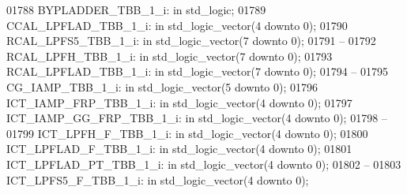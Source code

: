\begin{DoxyCode}
01788     BYPLADDER\_TBB\_1\_i:  \textcolor{keywordflow}{in} \textcolor{comment}{std\_logic};
01789     CCAL\_LPFLAD\_TBB\_1\_i:    \textcolor{keywordflow}{in} \textcolor{comment}{std\_logic\_vector}(\textcolor{vhdllogic}{}\textcolor{vhdllogic}{4} \textcolor{keywordflow}{downto} \textcolor{vhdllogic}{}\textcolor{vhdllogic}{0});
01790     RCAL\_LPFS5\_TBB\_1\_i: \textcolor{keywordflow}{in} \textcolor{comment}{std\_logic\_vector}(\textcolor{vhdllogic}{}\textcolor{vhdllogic}{7} \textcolor{keywordflow}{downto} \textcolor{vhdllogic}{}\textcolor{vhdllogic}{0});
01791 \textcolor{keyword}{    --}
01792     RCAL\_LPFH\_TBB\_1\_i:  \textcolor{keywordflow}{in} \textcolor{comment}{std\_logic\_vector}(\textcolor{vhdllogic}{}\textcolor{vhdllogic}{7} \textcolor{keywordflow}{downto} \textcolor{vhdllogic}{}\textcolor{vhdllogic}{0});
01793     RCAL\_LPFLAD\_TBB\_1\_i:    \textcolor{keywordflow}{in} \textcolor{comment}{std\_logic\_vector}(\textcolor{vhdllogic}{}\textcolor{vhdllogic}{7} \textcolor{keywordflow}{downto} \textcolor{vhdllogic}{}\textcolor{vhdllogic}{0});
01794 \textcolor{keyword}{    --}
01795     CG\_IAMP\_TBB\_1\_i:    \textcolor{keywordflow}{in} \textcolor{comment}{std\_logic\_vector}(\textcolor{vhdllogic}{}\textcolor{vhdllogic}{5} \textcolor{keywordflow}{downto} \textcolor{vhdllogic}{}\textcolor{vhdllogic}{0});
01796     ICT\_IAMP\_FRP\_TBB\_1\_i:   \textcolor{keywordflow}{in} \textcolor{comment}{std\_logic\_vector}(\textcolor{vhdllogic}{}\textcolor{vhdllogic}{4} \textcolor{keywordflow}{downto} \textcolor{vhdllogic}{}\textcolor{vhdllogic}{0});
01797     ICT\_IAMP\_GG\_FRP\_TBB\_1\_i:    \textcolor{keywordflow}{in} \textcolor{comment}{std\_logic\_vector}(\textcolor{vhdllogic}{}\textcolor{vhdllogic}{4} \textcolor{keywordflow}{downto} \textcolor{vhdllogic}{}\textcolor{vhdllogic}{0});
01798 \textcolor{keyword}{    --}
01799     ICT\_LPFH\_F\_TBB\_1\_i: \textcolor{keywordflow}{in} \textcolor{comment}{std\_logic\_vector}(\textcolor{vhdllogic}{}\textcolor{vhdllogic}{4} \textcolor{keywordflow}{downto} \textcolor{vhdllogic}{}\textcolor{vhdllogic}{0});
01800     ICT\_LPFLAD\_F\_TBB\_1\_i:   \textcolor{keywordflow}{in} \textcolor{comment}{std\_logic\_vector}(\textcolor{vhdllogic}{}\textcolor{vhdllogic}{4} \textcolor{keywordflow}{downto} \textcolor{vhdllogic}{}\textcolor{vhdllogic}{0});
01801     ICT\_LPFLAD\_PT\_TBB\_1\_i:  \textcolor{keywordflow}{in} \textcolor{comment}{std\_logic\_vector}(\textcolor{vhdllogic}{}\textcolor{vhdllogic}{4} \textcolor{keywordflow}{downto} \textcolor{vhdllogic}{}\textcolor{vhdllogic}{0});
01802 \textcolor{keyword}{    --}
01803     ICT\_LPFS5\_F\_TBB\_1\_i:    \textcolor{keywordflow}{in} \textcolor{comment}{std\_logic\_vector}(\textcolor{vhdllogic}{}\textcolor{vhdllogic}{4} \textcolor{keywordflow}{downto} \textcolor{vhdllogic}{}\textcolor{vhdllogic}{0});

\end{DoxyCode}

